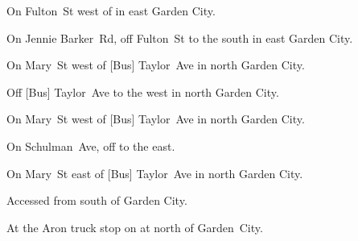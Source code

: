 

\begin{LocationList}

On   Fulton~St west of  in east Garden City.

On Jennie Barker~Rd, off   Fulton~St to the south in east Garden City.

\Location{\GarageHQ \Garage}
On Mary~St west of [Bus] Taylor~Ave in north Garden City.

Off [Bus] Taylor~Ave to the west in north Garden City.

On Mary~St west of [Bus] Taylor~Ave in north Garden City.

On Schulman~Ave, off    to the east.

On Mary~St east of [Bus] Taylor~Ave in north Garden City.

Accessed from 
south of Garden City.

At the Aron truck stop on  at   north of Garden~City.

\end{LocationList}
